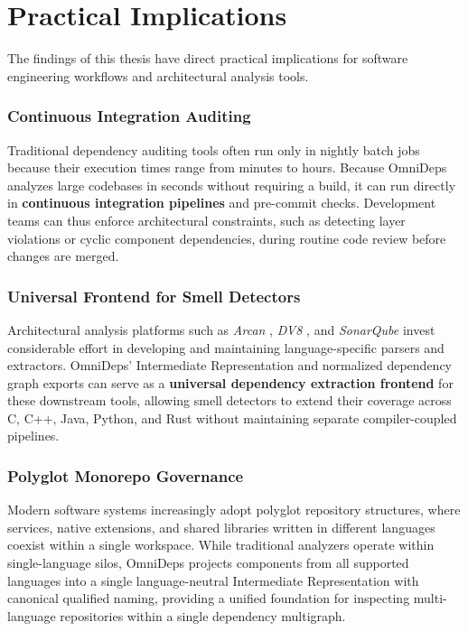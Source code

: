 \section{Practical Implications}
\label{sec:discussion_implications}

The findings of this thesis have direct practical implications for software
engineering workflows and architectural analysis tools.

\subsubsection{Continuous Integration Auditing}
\label{subsec:implications_ci_cd}

Traditional dependency auditing tools often run only in nightly batch jobs
because their execution times range from minutes to hours. Because OmniDeps
analyzes large codebases in seconds without requiring a build, it can run
directly in \textbf{continuous integration pipelines} and pre-commit checks.
Development teams can thus enforce architectural constraints, such as detecting
layer violations or cyclic component dependencies, during routine code review
before changes are merged.

\subsubsection{Universal Frontend for Smell Detectors}
\label{subsec:implications_smell_detection}

Architectural analysis platforms such as \textit{Arcan}
\cite{fontana_arcan_2017}, \textit{DV8} \cite{cai_dv8_2019}, and
\textit{SonarQube} invest considerable effort in developing and maintaining
language-specific parsers and extractors. OmniDeps' Intermediate
Representation
and normalized dependency graph exports can serve as a \textbf{universal
dependency extraction frontend} for these downstream tools, allowing
smell detectors to
extend their coverage across C, C++, Java, Python, and Rust without maintaining
separate compiler-coupled pipelines.

\subsubsection{Polyglot Monorepo Governance}
\label{subsec:implications_monorepos}

Modern software systems increasingly adopt polyglot repository
structures,\linebreak
where services, native extensions, and shared libraries written in different
languages coexist within a single workspace. While traditional analyzers
operate within single-language silos, OmniDeps projects components from all
supported languages into a single language-neutral Intermediate Representation
with canonical qualified naming, providing a unified foundation for inspecting
mul\-ti-lan\-guage repositories within a single dependency multigraph.

